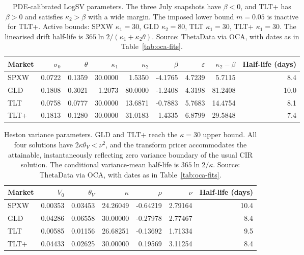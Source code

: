 \begin{table}[htbp]\centering\small
\begin{tabular}{@{}l r r r r r r r r@{}}\toprule
Market & $\sigma_0$ & $\theta$ & $\kappa_1$ & $\kappa_2$ & $\beta$ & $\varepsilon$ & $\kappa_2-\beta$ & Half-life (days)\\\midrule

SPXW & 0.0722 & 0.1359 & 30.0000 & 1.5350 & -4.1765 & 4.7239 & 5.7115 & 8.4 \\

GLD & 0.1808 & 0.3021 & 1.2073 & 80.0000 & -1.2408 & 4.3198 & 81.2408 & 10.0 \\

TLT & 0.0758 & 0.0777 & 30.0000 & 13.6871 & -0.7883 & 5.7683 & 14.4754 & 8.1 \\

TLT+ & 0.1813 & 0.1280 & 30.0000 & 31.0183 & 1.4335 & 6.8799 & 29.5848 & 7.4 \\

\bottomrule\end{tabular}
\caption{PDE-calibrated LogSV parameters. The three July snapshots have $\beta<0$, and
TLT+ has $\beta>0$ and satisfies $\kappa_2>\beta$ with a wide margin. The imposed
lower bound $m=0.05$ is inactive for TLT+. Active bounds: SPXW $\kappa_1=30$, GLD $\kappa_2=80$, TLT $\kappa_1=30$, TLT+ $\kappa_1=30$. The linearised drift half-life is
$365\ln2/(\kappa_1+\kappa_2\theta)$. Source: ThetaData via OCA, with dates as in Table~\ref{tab:oca-fits}.}
\label{tab:oca-logsv-params}\end{table}

\begin{table}[htbp]\centering\small
\begin{tabular}{@{}l r r r r r r@{}}\toprule
Market & $V_0$ & $\theta_V$ & $\kappa$ & $\rho$ & $\nu$ & Half-life (days)\\\midrule

SPXW & 0.00353 & 0.03453 & 24.26049 & -0.64219 & 2.79164 & 10.4 \\

GLD & 0.04286 & 0.06558 & 30.00000 & -0.27978 & 2.77467 & 8.4 \\

TLT & 0.00585 & 0.01156 & 26.68251 & -0.13692 & 1.71334 & 9.5 \\

TLT+ & 0.04433 & 0.02625 & 30.00000 & 0.19569 & 3.11254 & 8.4 \\

\bottomrule\end{tabular}
\caption{Heston variance parameters. GLD and TLT+ reach the $\kappa=30$ upper bound. All
four solutions have $2\kappa\theta_V<\nu^2$, and the transform pricer accommodates
the attainable, instantaneously reflecting zero variance boundary of the usual CIR
solution. The conditional variance-mean half-life is $365\ln2/\kappa$. Source: ThetaData via OCA, with dates as in Table~\ref{tab:oca-fits}.}
\label{tab:oca-heston-params}\end{table}

